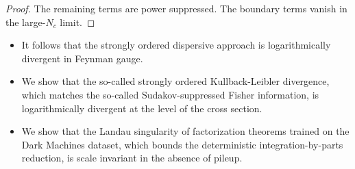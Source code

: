 \begin{proof}
The remaining terms are power suppressed. The boundary terms vanish in
the large-$N_c$ limit.
\end{proof}

\begin{itemize}
  \item It follows that the strongly ordered dispersive approach is logarithmically divergent in Feynman gauge.
  \item We show that the so-called strongly ordered Kullback-Leibler divergence, which matches the so-called Sudakov-suppressed Fisher information, is logarithmically divergent at the level of the cross section.
  \item We show that the Landau singularity of factorization theorems trained on the Dark Machines dataset, which bounds the deterministic integration-by-parts reduction, is scale invariant in the absence of pileup.
\end{itemize}

